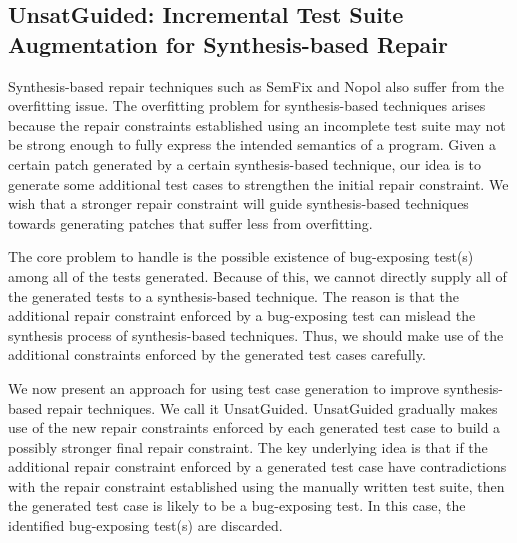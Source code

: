 \documentclass[]{sig-alternate}
\begin{document}
\subsection{UnsatGuided: Incremental Test Suite Augmentation for Synthesis-based Repair}

Synthesis-based repair techniques such as SemFix and Nopol also suffer from the overfitting issue. The overfitting problem for synthesis-based techniques arises because the repair constraints established using an incomplete test suite may not be strong enough to fully express the intended semantics of a program. Given a certain patch generated by a certain synthesis-based technique, our idea is to generate some additional test cases to strengthen the initial repair constraint.  We wish that a stronger repair constraint will guide synthesis-based techniques towards generating patches that suffer less from overfitting. 

The core problem to handle is the possible existence of bug-exposing test(s) among all of the tests generated.
Because of this, we cannot directly supply all of the generated tests to a synthesis-based technique. The reason is that 
the additional repair constraint enforced by a bug-exposing test can mislead the synthesis process of synthesis-based techniques. Thus, we should make use of the additional constraints enforced by the generated test cases carefully.
 
We now present an approach for using test case generation to improve synthesis-based repair techniques. We call it UnsatGuided. UnsatGuided gradually makes use of the new repair constraints enforced by each generated test case to build a possibly stronger final repair constraint. The key underlying idea is that if the additional repair constraint enforced by a generated test case have contradictions with the repair constraint established using the manually written test suite, then the generated test case is likely to be a bug-exposing test. In this case, the identified bug-exposing test(s) are discarded. 
\end{document}

